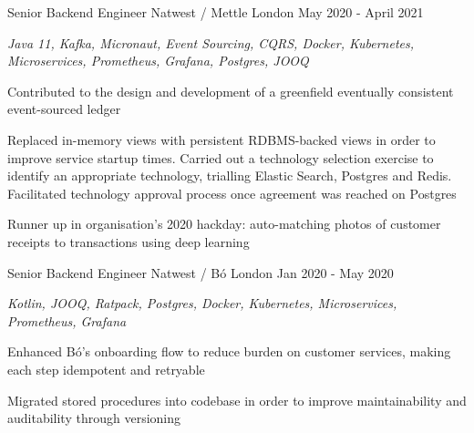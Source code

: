 \begin{cventries}
  \cventry
    {Senior Backend Engineer} %
    {Natwest / Mettle} %
    {London} %
    {May 2020 - April 2021} %
    {
      \begin{cvitems} %
        \item {\itshape{Java 11, Kafka, Micronaut, Event Sourcing, CQRS, Docker, Kubernetes, Microservices, Prometheus, Grafana, Postgres, JOOQ}}
        \item {Contributed to the design and development of a greenfield eventually consistent event-sourced ledger}
        \item {Replaced in-memory views with persistent RDBMS-backed views in order to improve service startup times. Carried out a technology selection exercise to identify an appropriate technology, trialling Elastic Search, Postgres and Redis. Facilitated technology approval process once agreement was reached on Postgres}
        \item {Runner up in organisation's 2020 hackday: auto-matching photos of customer receipts to transactions using deep learning}
      \end{cvitems}
    }

  \cventry
    {Senior Backend Engineer} %
    {Natwest / Bó} %
    {London} %
    {Jan 2020 - May 2020} %
    {
      \begin{cvitems} %
        \item {\itshape{Kotlin, JOOQ, Ratpack, Postgres, Docker, Kubernetes, Microservices, Prometheus, Grafana}}
        \item {Enhanced Bó's onboarding flow to reduce burden on customer services, making each step idempotent and retryable}
        \item {Migrated stored procedures into codebase in order to improve maintainability and auditability through versioning}
      \end{cvitems}
    }


\end{cventries}
